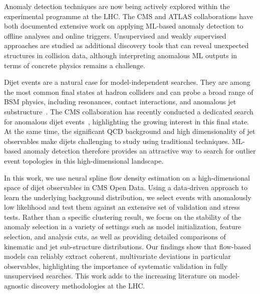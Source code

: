\documentclass[11pt,a4paper,twocolumn]{article}
\begin{document}
Anomaly detection techniques are now being actively explored within the experimental programme at the LHC. The CMS and ATLAS collaborations have both documented extensive work on applying ML-based anomaly detection to offline analyses and online triggers. Unsupervised and weakly supervised approaches are studied as additional discovery tools that can reveal unexpected structures in collision data, although interpreting anomalous ML outputs in terms of concrete physics remains a challenge.

Dijet events are a natural case for model-independent searches. They are among the most common final states at hadron colliders and can probe a broad range of BSM physics, including resonances, contact interactions, and anomalous jet substructure~\cite{CMS2012DijetResonance,CMS2012Compositeness}. The CMS collaboration has recently conducted a dedicated search for anomalous dijet events~\cite{CMS2024DijetAnomaly}, highlighting the growing interest in this final state. At the same time, the significant QCD background and high dimensionality of jet observables make dijets challenging to study using traditional techniques. ML-based anomaly detection therefore provides an attractive way to search for outlier event topologies in this high-dimensional landscape.

In this work, we use neural spline flow density estimation on a high-dimensional space of dijet observables in CMS Open Data. Using a data-driven approach to learn the underlying background distribution, we select events with anomalously low likelihood and test them against an extensive set of validation and stress tests. Rather than a specific clustering result, we focus on the stability of the anomaly selection in a variety of settings such as model initialization, feature selection, and analysis cuts, as well as providing detailed comparisons of kinematic and jet sub-structure distributions. Our findings show that flow-based models can reliably extract coherent, multivariate deviations in particular observables, highlighting the importance of systematic validation in fully unsupervised searches. This work adds to the increasing literature on model-agnostic discovery methodologies at the LHC.
\end{document}
